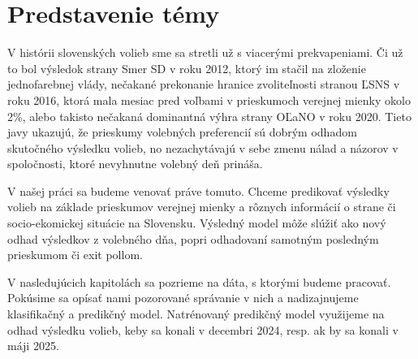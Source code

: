 \documentclass[report.tex]{subfiles}
\begin{document}
	
\section{Predstavenie témy}	
	
V histórii slovenských volieb sme sa stretli už s viacerými prekvapeniami. Či už to bol výsledok strany Smer SD v roku 2012, ktorý im stačil na zloženie jednofarebnej vlády, nečakané prekonanie hranice zvoliteľnosti stranou ĽSNS v roku 2016, ktorá mala mesiac pred voľbami v prieskumoch verejnej mienky okolo 2\%, alebo takisto nečakaná dominantná výhra strany OĽaNO v roku 2020. Tieto javy ukazujú, že prieskumy volebných preferencií sú dobrým odhadom skutočného výsledku volieb, no nezachytávajú v sebe zmenu nálad a názorov v spoločnosti, ktoré nevyhnutne volebný deň prináša.

V našej práci sa budeme venovať práve tomuto. Chceme predikovať výsledky volieb na základe prieskumov verejnej mienky a rôznych informácií o strane či socio-ekomickej situácie na Slovensku. Výsledný model môže slúžiť ako nový odhad výsledkov z volebného dňa, popri odhadovaní samotným posledným prieskumom či exit pollom. 

V nasledujúcich kapitolách sa pozrieme na dáta, s ktorými budeme pracovať. Pokúsime sa opísať nami pozorované správanie v nich a nadizajnujeme klasifikačný a predikčný model. Natrénovaný predikčný model využijeme na odhad výsledku volieb, keby sa konali v decembri 2024, resp. ak by sa konali v máji 2025.
	
\end{document}

